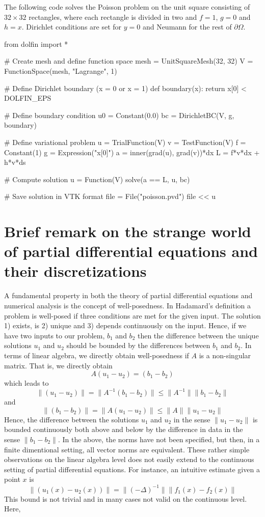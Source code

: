 The following code solves the Poisson problem on the unit square
consisting of $32\times 32$ rectangles, where each rectangle is divided
in two and $f=1$, $g=0$ and $h=x$. Dirichlet conditions are set 
for $y=0$ and Neumann for the rest of $\partial \Omega$.  

\begin{python}
from dolfin import *

# Create mesh and define function space
mesh = UnitSquareMesh(32, 32)
V = FunctionSpace(mesh, "Lagrange", 1)

# Define Dirichlet boundary (x = 0 or x = 1)
def boundary(x): return x[0] < DOLFIN_EPS 

# Define boundary condition
u0 = Constant(0.0)
bc = DirichletBC(V, g, boundary)

# Define variational problem
u = TrialFunction(V)
v = TestFunction(V)
f = Constant(1)
g = Expression("x[0]")
a = inner(grad(u), grad(v))*dx
L = f*v*dx + h*v*ds

# Compute solution
u = Function(V)
solve(a == L, u, bc)

# Save solution in VTK format
file = File("poisson.pvd")
file << u
\end{python}

\section{Brief remark on the strange world of partial differential equations and their discretizations }

A fundamental property in both the theory of partial differential equations and numerical analysis is the
concept of well-posedness. In Hadamard's definition a problem is well-posed if three conditions are met for the given input.  
The solution 1) exists, is 2) unique
and 3) depends continuously on the input. Hence, if we have two inputs to our problem, $b_1$ and $b_2$ 
then the difference between the unique solutions $u_1$ and $u_2$ should be bounded by the differences
between $b_1$ and $b_2$. In terms of linear algebra, we directly obtain well-posedness if
$A$ is a non-singular matrix. That is, we directly obtain 
\[
A(u_1 - u_2)  = (b_1 - b_2)     
\]
which leads to 
\[
	\|(u_1 - u_2) \| = \|A^{-1}(b_1 - b_2)\| \le  \|A^{-1}\| \|b_1 - b_2\|     
\]
and 
\[
	\|(b_1 - b_2) \| = \|A (u_1 - u_2)\|  \le  \|A\| \|u_1 - u_2\|     
\]
Hence, the difference between the solutions $u_1$ and $u_2$ in the sense 
$\|u_1 - u_2\|$ is bounded continuously both above and below by the difference in data in the sense $\|b_1 - b_2\|$.    
In the above, the norms have not been specified, but then, in a finite dimentional setting, all vector norms are equivalent.   
These rather simple observations on the linear algebra level does not easily extend to the continuous setting of partial differential equations. 
For instance, an intuitive estimate given a point $x$ is  
\[
	\|(u_1(x) - u_2(x)) \| = \|(-\Delta)^{-1} \| \|f_1(x) - f_2(x)\|     
\]
This bound is not trivial and in many cases not valid on the continuous level. Here, 

